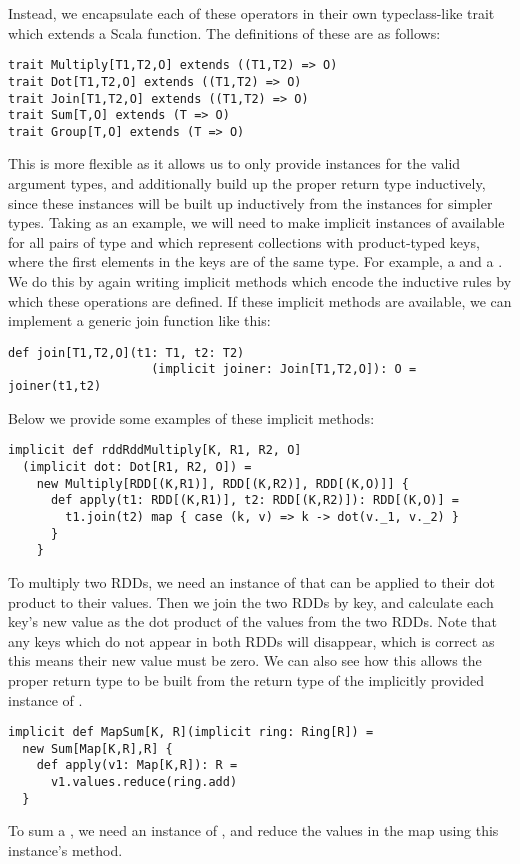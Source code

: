 \vs Instead, we encapsulate each of these operators in their own typeclass-like trait which extends a Scala function. The definitions of these are as follows:
\vs\begin{lstlisting}
trait Multiply[T1,T2,O] extends ((T1,T2) => O)
trait Dot[T1,T2,O] extends ((T1,T2) => O)
trait Join[T1,T2,O] extends ((T1,T2) => O)
trait Sum[T,O] extends (T => O)
trait Group[T,O] extends (T => O)
\end{lstlisting}\vs
This is more flexible as it allows us to only provide instances for the valid argument types, and additionally build up the proper return type inductively, since these instances will be built up inductively from the instances for simpler types.
Taking  as an example, we will need to make implicit instances of available for all pairs of type  and  which represent collections with product-typed keys, where the first elements in the keys are of the same type. For example, a  and a . We do this by again writing implicit methods which encode the inductive rules by which these operations are defined. If these implicit methods are available, we can implement a generic join function like this:
\vs\begin{lstlisting}
def join[T1,T2,O](t1: T1, t2: T2)
                    (implicit joiner: Join[T1,T2,O]): O = joiner(t1,t2)
\end{lstlisting}\vs
Below we provide some examples of these implicit methods:
\vs\begin{lstlisting}
implicit def rddRddMultiply[K, R1, R2, O]
  (implicit dot: Dot[R1, R2, O]) =
    new Multiply[RDD[(K,R1)], RDD[(K,R2)], RDD[(K,O)]] {
      def apply(t1: RDD[(K,R1)], t2: RDD[(K,R2)]): RDD[(K,O)] = 
        t1.join(t2) map { case (k, v) => k -> dot(v._1, v._2) }
      }
    }
\end{lstlisting}\vs
To multiply two RDDs, we need an instance of  that can be applied to their dot product to their values. Then we join the two RDDs by key, and calculate each key's new value as the dot product of the values from the two RDDs. Note that any keys which do not appear in both RDDs will disappear, which is correct as this means their new value must be zero. We can also see how this allows the proper return type to be built from the return type  of the implicitly provided instance of .
\vs\begin{lstlisting}
implicit def MapSum[K, R](implicit ring: Ring[R]) =
  new Sum[Map[K,R],R] {
    def apply(v1: Map[K,R]): R =
      v1.values.reduce(ring.add)
  }
\end{lstlisting}\vs
To sum a , we need an instance of , and reduce the values in the map using this instance's  method.

